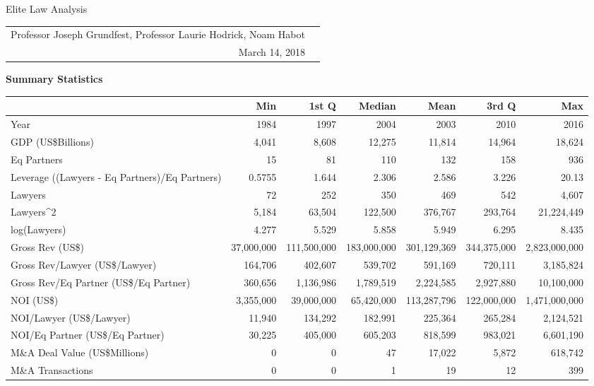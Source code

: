 \documentclass{article}
\begin{document}
\begin{center}{\LARGE Elite Law Analysis}
\\
\begin{tabular}{rl}\\Professor Joseph Grundfest, Professor Laurie Hodrick, Noam Habot \\March 14, 2018\end{tabular}\end{center}{\large \textbf{Summary Statistics} }%
\begin{table}[H]
\centering
\begin{tabular}{lrrrrrr}
  \hline
 & Min & 1st Q & Median & Mean & 3rd Q & Max \\ 
  \hline
Year & 1984 & 1997 & 2004 & 2003 & 2010 & 2016 \\ 
  GDP (US\$Billions) & 4,041 & 8,608 & 12,275 & 11,814 & 14,964 & 18,624 \\ 
  Eq Partners & 15 & 81 & 110 & 132 & 158 & 936 \\ 
  Leverage ((Lawyers - Eq Partners)/Eq Partners) & 0.5755 & 1.644 & 2.306 & 2.586 & 3.226 & 20.13 \\ 
  Lawyers & 72 & 252 & 350 & 469 & 542 & 4,607 \\ 
  Lawyers^2 & 5,184 & 63,504 & 122,500 & 376,767 & 293,764 & 21,224,449 \\ 
  log(Lawyers) & 4.277 & 5.529 & 5.858 & 5.949 & 6.295 & 8.435 \\ 
   \hline
Gross Rev (US\$) & 37,000,000 & 111,500,000 & 183,000,000 & 301,129,369 & 344,375,000 & 2,823,000,000 \\ 
  Gross Rev/Lawyer (US\$/Lawyer) & 164,706 & 402,607 & 539,702 & 591,169 & 720,111 & 3,185,824 \\ 
  Gross Rev/Eq Partner (US\$/Eq Partner) & 360,656 & 1,136,986 & 1,789,519 & 2,224,585 & 2,927,880 & 10,100,000 \\ 
  NOI (US\$) & 3,355,000 & 39,000,000 & 65,420,000 & 113,287,796 & 122,000,000 & 1,471,000,000 \\ 
  NOI/Lawyer (US\$/Lawyer) & 11,940 & 134,292 & 182,991 & 225,364 & 265,284 & 2,124,521 \\ 
  NOI/Eq Partner (US\$/Eq Partner) & 30,225 & 405,000 & 605,203 & 818,599 & 983,021 & 6,601,190 \\ 
   \hline
M\&A Deal Value (US\$Millions) & 0 & 0 & 47 & 17,022 & 5,872 & 618,742 \\ 
  M\&A Transactions & 0 & 0 & 1 & 19 & 12 & 399 \\ 

\end{tabular}
\end{table}
\end{document}
